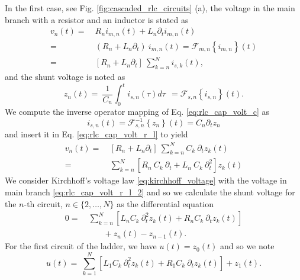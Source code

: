 \documentclass[a4paper, 10pt, twoside, twocolumn]{scrartcl}
\begin{document}
In the first case, see Fig. \ref{fig:cascaded_rlc_circuits} (a), the voltage in the main branch with a resistor and an inductor is stated as
\begin{align}
	v_{n}(t) =&~ R_n i_{m,n}(t) + L_n \partial_{t} i_{m,n}(t) \nonumber \\ 
	=&~ (R_{n} + L_{n}\partial_{t}) ~ i_{m,n}(t) = \mathcal{F}_{m,n} \left\{i_{m,n}\right\}(t) \\ 
	=&~ \left[R_{n} + L_{n}\partial_{t}\right] ~ \sum_{k=n}^{N} i_{s,k}(t) \text{,} \label{eq:rlc_cap_volt_r_l}
\end{align}
and the shunt voltage is noted as
\begin{equation}
	z_{n}(t) =~ \frac{1}{C_{n}} \int_{0}^{t} i_{s,n}(\tau) d\tau ~~= \mathcal{F}_{s,n} \left\{i_{s,n}\right\}(t) \text{.} \label{eq:rlc_cap_volt_c}
\end{equation}
We compute the inverse operator mapping of Eq. \eqref{eq:rlc_cap_volt_c} as 
\begin{equation*}
	i_{s,n}(t) = \mathcal{F}_{s,n}^{-1} \left\{z_{n}\right\}(t) = C_{n} \partial_{t} z_{n}	
\end{equation*}
and insert it in Eq. \eqref{eq:rlc_cap_volt_r_l} to yield
\begin{align}
		v_{n}(t) =&~  \left[R_{n} + L_{n}\partial_{t}\right] ~ \sum_{k=n}^{N} C_{k} ~ \partial_{t} z_{k}(t) \nonumber \\
		=&~  \sum_{k=n}^{N} \left[ R_{n} ~  C_{k} ~  \partial_{t} + L_{n} ~  C_{k} ~ \partial^2_{t}\right] z_{k}(t) \label{eq:rlc_cap_volt_r_l_2}
\end{align}
We consider Kirchhoff's voltage law \eqref{eq:kirchhoff_voltage} with the voltage in main branch \eqref{eq:rlc_cap_volt_r_l_2} and so we calculate the shunt voltage for the $n$-th circuit, $n\in\{2,\ldots,N\}$ as the differential equation
\begin{align}
	0 =&~ \sum_{k=n}^{N} \left[ L_{n} C_{k} ~ \partial_{t}^2 z_{k}(t) + R_{n} C_{k} ~ \partial_{t} z_{k}(t)  \right] \nonumber \\
	&\qquad  + z_{n}(t) - z_{n-1}(t) \text{.} \label{eq:rl-c_shunt_ode_n}
\end{align}
For the first circuit of the ladder, we have $u(t) = z_{0}(t)$ and so we note
\begin{equation}
	u(t) =~ \sum_{k=1}^{N} \left[ L_{1} C_{k} ~ \partial_{t}^2 z_{k}(t) + R_{1} C_{k} ~ \partial_{t} z_{k}(t)  \right] + z_{1}(t) \text{.} \label{eq:rl-c_shunt_ode_0}
\end{equation}
\end{document}
